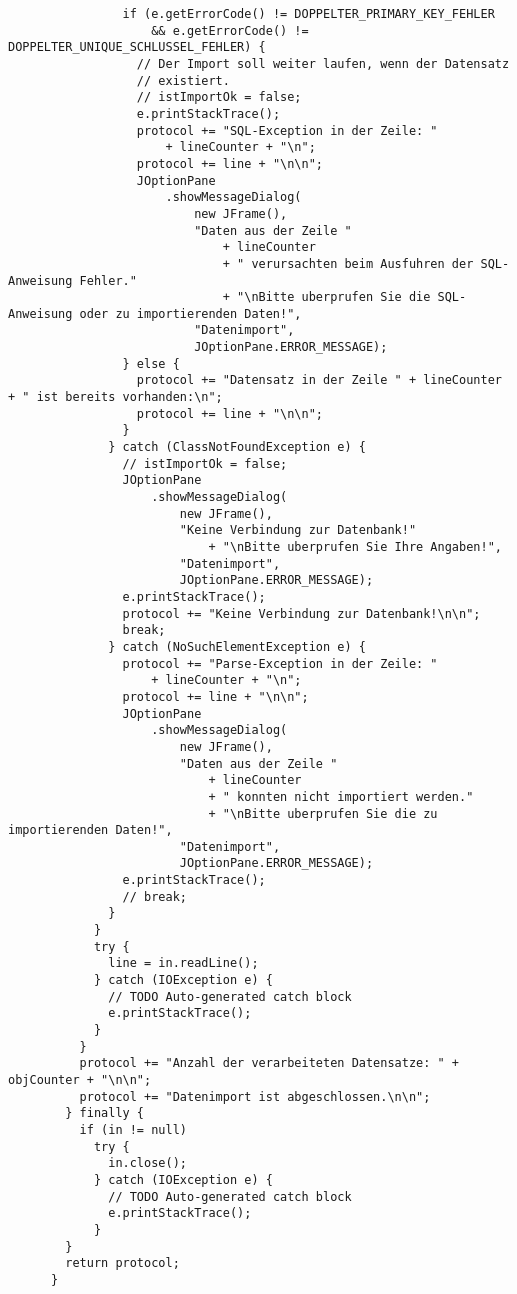 \begin{lstlisting}
                if (e.getErrorCode() != DOPPELTER_PRIMARY_KEY_FEHLER
                    && e.getErrorCode() != DOPPELTER_UNIQUE_SCHLUSSEL_FEHLER) {
                  // Der Import soll weiter laufen, wenn der Datensatz
                  // existiert.
                  // istImportOk = false;
                  e.printStackTrace();
                  protocol += "SQL-Exception in der Zeile: "
                      + lineCounter + "\n";
                  protocol += line + "\n\n";
                  JOptionPane
                      .showMessageDialog(
                          new JFrame(),
                          "Daten aus der Zeile "
                              + lineCounter
                              + " verursachten beim Ausfuhren der SQL-Anweisung Fehler."
                              + "\nBitte uberprufen Sie die SQL-Anweisung oder zu importierenden Daten!",
                          "Datenimport",
                          JOptionPane.ERROR_MESSAGE);
                } else {
                  protocol += "Datensatz in der Zeile " + lineCounter + " ist bereits vorhanden:\n";
                  protocol += line + "\n\n";
                }
              } catch (ClassNotFoundException e) {
                // istImportOk = false;
                JOptionPane
                    .showMessageDialog(
                        new JFrame(),
                        "Keine Verbindung zur Datenbank!"
                            + "\nBitte uberprufen Sie Ihre Angaben!",
                        "Datenimport",
                        JOptionPane.ERROR_MESSAGE);
                e.printStackTrace();
                protocol += "Keine Verbindung zur Datenbank!\n\n";
                break;
              } catch (NoSuchElementException e) {
                protocol += "Parse-Exception in der Zeile: "
                    + lineCounter + "\n";
                protocol += line + "\n\n";
                JOptionPane
                    .showMessageDialog(
                        new JFrame(),
                        "Daten aus der Zeile "
                            + lineCounter
                            + " konnten nicht importiert werden."
                            + "\nBitte uberprufen Sie die zu importierenden Daten!",
                        "Datenimport",
                        JOptionPane.ERROR_MESSAGE);
                e.printStackTrace();
                // break;
              }
            }
            try {
              line = in.readLine();
            } catch (IOException e) {
              // TODO Auto-generated catch block
              e.printStackTrace();
            }
          }
          protocol += "Anzahl der verarbeiteten Datensatze: " + objCounter + "\n\n";
          protocol += "Datenimport ist abgeschlossen.\n\n";
        } finally {
          if (in != null)
            try {
              in.close();
            } catch (IOException e) {
              // TODO Auto-generated catch block
              e.printStackTrace();
            }
        }
        return protocol;
      }


\end{lstlisting}
